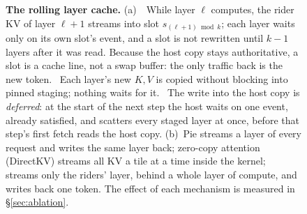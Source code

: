 \begin{figure}[t]
\caption{\textbf{The rolling layer cache.}
(a)~~While layer $\ell$ computes, the rider KV of layer $\ell{+}1$ streams
into slot $s_{(\ell+1)\bmod k}$; each layer waits only on its own slot's event, and
a slot is not rewritten until $k{-}1$ layers after it was read. Because the host
copy stays authoritative, a slot is a cache line, not a swap buffer: the only
traffic back is the new token. ~Each layer's new $K,V$ is copied without
blocking into pinned staging; nothing waits for it. ~The write into the
host copy is \emph{deferred}: at the start of the next step the host waits on one
event, already satisfied, and scatters every staged layer at once, before that
step's first fetch reads the host copy.
(b)~Pie streams a layer of every request and writes the same layer back;
zero-copy attention (DirectKV) streams all KV a tile at a time inside the kernel;
\sysname{} streams only the riders' layer, behind a whole layer of compute, and
writes back one token. The effect of each mechanism is measured in
\S\ref{sec:ablation}.}
\label{fig:rolling}
\end{figure}
